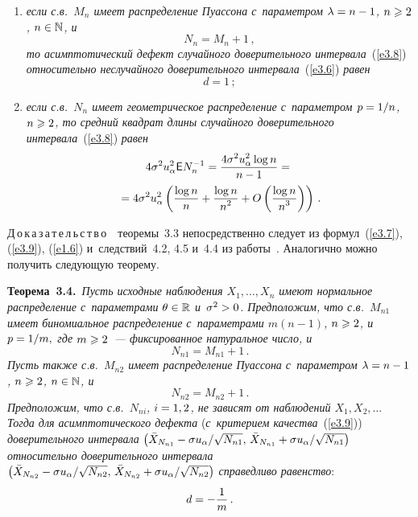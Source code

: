 \begin{multicols}{2}
\begin{enumerate}[(1)]
\item \textit{если с.в.~$M_n$ имеет распределение Пуассона с~параметром 
$\lambda\hm = n\hm - 1$, $n\hm \geqslant 2$, $n\hm \in \mathbb{N}$, и}
$$
N_n = M_n + 1\,,
$$
\textit{то асимптотический дефект случайного доверительного интервала}~(\ref{e3.8}) 
\textit{относительно неслучайного доверительного интервала}~(\ref{e3.6}) \textit{равен}
$$
d = 1\,;
$$

\item \textit{если с.в.~$N_n$ имеет геометрическое распределение 
с~параметром $p\hm = 1/n$, $n\hm \geqslant 2$, то средний квадрат длины 
случайного доверительного интервала}~(\ref{e3.8}) \textit{равен}
\begin{multline*}
4\sigma^2 u_{\alpha}^2 {\sf E} N_n^{-1} = 
\displaystyle\frac{\displaystyle 4\sigma^2 u_{\alpha}^2\log n\mathstrut}{\displaystyle n - 1\mathstrut} = {}\\
{}=
4\sigma^2 u_{\alpha}^2 \left(\displaystyle\frac{\displaystyle \log n\mathstrut}{\displaystyle n\mathstrut} + \displaystyle\frac{\displaystyle \log n\mathstrut}{\displaystyle n^2\mathstrut} +  O
\left(\displaystyle\frac{\displaystyle \log n\mathstrut}{\displaystyle n^3\mathstrut}\right)\right)\,.
\end{multline*}
\end{enumerate}

\noindent
Д\,о\,к\,а\,з\,а\,т\,е\,л\,ь\,с\,т\,в\,о~~теоремы~3.3 непосредственно 
следует из формул~(\ref{e3.7}), (\ref{e3.9}), (\ref{e1.6}) 
и~следствий~4.2, 4.5 и~4.4 из работы~\cite{2-ben}. 
Аналогично можно получить следующую теорему.

\smallskip

\noindent
\textbf{Теорема~3.4.}\ \textit{Пусть исходные наблюдения $X_1,\ldots,X_n$ имеют 
нормальное распределение с~параметрами $\theta\hm \in \mathbb{R}$ и~$\sigma^2\hm > 0$. 
Предположим, что с.в.~$M_{n1}$ имеет биномиальное распределение 
с~па\-ра\-мет\-ра\-ми $m(n-1)$, $n\hm \geqslant 2$, и~$p\hm = 1/m,$ где $m\hm \geqslant 2$~--- фиксированное натуральное число, и}
$$
N_{n1} = M_{n1} + 1\,.
$$
\textit{Пусть также с.в.~$M_{n2}$ имеет распределение Пуассона 
с~параметром $\lambda\hm = n\hm - 1$, $n\hm \geqslant 2$, $n\hm \in \mathbb{N}$, и}
$$
N_{n2} = M_{n2} + 1\,.
$$
\textit{Предположим, что с.в.~$N_{ni}$, $i\hm = 1,2$, не 
зависят от наблюдений $X_1, X_2,\ldots$
Тогда для асимптотического дефекта} (\textit{с~критерием качества}~(\ref{e3.9})) 
\textit{доверительного интервала}
$\left(\bar X_{N_{n1}} \hm- {\sigma u_\alpha}/{\sqrt {N_{n1}}},\, 
\bar X_{N_{n1}} \hm+ {\sigma u_\alpha}/{\sqrt {N_{n1}}}\right)$
\textit{относительно доверительного интервала}
$
\left(\bar X_{N_{n2}} \hm- {\sigma u_\alpha}/{\sqrt {N_{n2}}},\,
\bar X_{N_{n2}}\hm + {\sigma u_\alpha}/{\sqrt {N_{n2}}}\right)
$
\textit{справедливо равенство}:
$$
d = - \displaystyle\frac{\displaystyle 1\mathstrut}{\displaystyle m\mathstrut}\,.
$$



\end{multicols}
